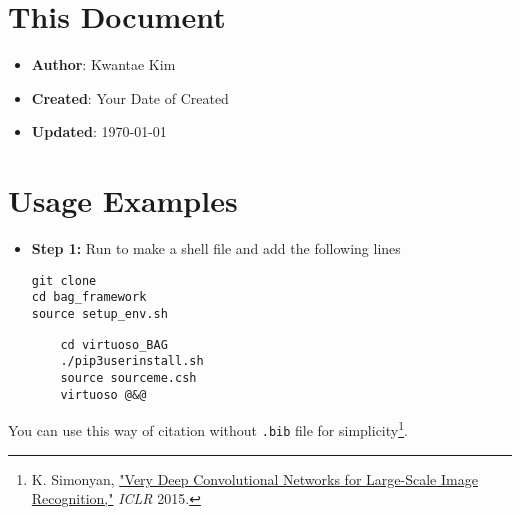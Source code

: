 \documentclass[a4paper,12pt]{article}
\begin{document}
\section*{This Document}

\begin{itemize}
    \item \textbf{Author}: Kwantae Kim
    \item \textbf{Created}: Your Date of Created
    \item \textbf{Updated}: \today
\end{itemize}

\tableofcontents

\pagebreak


\section{Usage Examples}

\begin{itemize}
    \item[\footnotesize\faCode] \textbf{Step 1:} Run  to make a shell file and add the following lines
          \vspace{-1em}\begin{verbatim}
git clone
cd bag_framework
source setup_env.sh
        \end{verbatim}
          \vspace{-1em}\begin{verbatim}
    cd virtuoso_BAG
    ./pip3userinstall.sh
    source sourceme.csh
    virtuoso @&@
        \end{verbatim}
\end{itemize}

You can use this way of citation without \texttt{.bib} file for simplicity\footnote{K. Simonyan, \href{https://arxiv.org/abs/1409.1556}{"Very Deep Convolutional Networks for Large-Scale Image Recognition,"} \textit{ICLR} 2015.}.

\label{lastpage}        %
\end{document}
